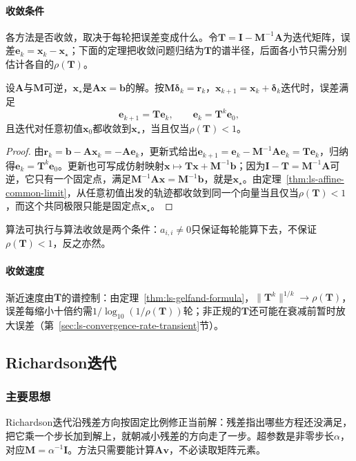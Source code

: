 \paragraph{收敛条件}
各方法是否收敛，取决于每轮把误差变成什么。令$\bm T=\bm I-\bm M^{-1}\bm A$为迭代矩阵，误差$\bm e_k=\bm x_k-\bm x_\star$；下面的定理把收敛问题归结为$\bm T$的谱半径，后面各小节只需分别估计各自的$\rho(\bm T)$。
\begin{theorem}[定常迭代的收敛判据]
\label{thm:ls-stationary-convergence}
设$\bm A$与$\bm M$可逆，$\bm x_\star$是$\bm A\bm x=\bm b$的解。按$\bm M\bm\delta_k=\bm r_k$，$\bm x_{k+1}=\bm x_k+\bm\delta_k$迭代时，误差满足
\[
\bm e_{k+1}=\bm T\bm e_k,\qquad \bm e_k=\bm T^k\bm e_0 ,
\]
且迭代对任意初值$\bm x_0$都收敛到$\bm x_\star$，当且仅当$\rho(\bm T)<1$。
\end{theorem}
\begin{proof}
由$\bm r_k=\bm b-\bm A\bm x_k=-\bm A\bm e_k$，更新式给出$\bm e_{k+1}=\bm e_k-\bm M^{-1}\bm A\bm e_k=\bm T\bm e_k$，归纳得$\bm e_k=\bm T^k\bm e_0$。更新也可写成仿射映射$\bm x\mapsto\bm T\bm x+\bm M^{-1}\bm b$；因为$\bm I-\bm T=\bm M^{-1}\bm A$可逆，它只有一个固定点，满足$\bm M^{-1}\bm A\bm x=\bm M^{-1}\bm b$，就是$\bm x_\star$。由定理~\ref{thm:ls-affine-common-limit}，从任意初值出发的轨迹都收敛到同一个向量当且仅当$\rho(\bm T)<1$，而这个共同极限只能是固定点$\bm x_\star$。
\end{proof}
算法可执行与算法收敛是两个条件：$a_{i,i}\neq0$只保证每轮能算下去，不保证$\rho(\bm T)<1$，反之亦然。

\paragraph{收敛速度}
渐近速度由$\bm T$的谱控制：由定理~\ref{thm:ls-gelfand-formula}，$\lVert\bm T^k\rVert^{1/k}\to\rho(\bm T)$，误差每缩小十倍约需$1/\log_{10}(1/\rho(\bm T))$轮；非正规的$\bm T$还可能在衰减前暂时放大误差（第~\ref{sec:ls-convergence-rate-transient}节）。

\subsection{Richardson迭代}
\label{sec:ls-richardson}

\subsubsection{主要思想}

Richardson迭代沿残差方向按固定比例修正当前解：残差指出哪些方程还没满足，把它乘一个步长加到解上，就朝减小残差的方向走了一步。超参数是非零步长$\alpha$，对应$\bm M=\alpha^{-1}\bm I$。方法只需要能计算$\bm A\bm v$，不必读取矩阵元素。

